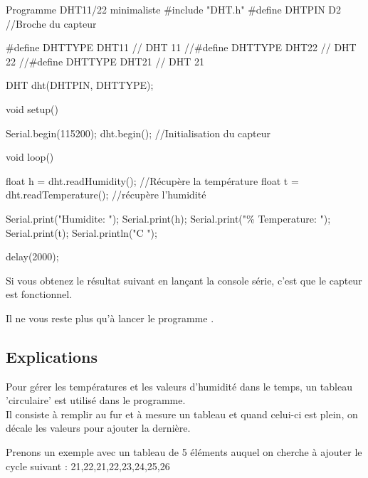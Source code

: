 \begin{Cpp}{Programme DHT11/22 minimaliste}
    #include "DHT.h"
    #define DHTPIN D2     //Broche du capteur
    
    #define DHTTYPE DHT11   // DHT 11
    //#define DHTTYPE DHT22   // DHT 22 
    //#define DHTTYPE DHT21   // DHT 21 
    
    DHT dht(DHTPIN, DHTTYPE);
    
    void setup() {
      
      Serial.begin(115200);
      dht.begin();          //Initialisation du capteur
    }
    
    void loop() {
    
      float h = dht.readHumidity();       //Récupère la température
      float t = dht.readTemperature();    //récupère l'humidité
    
      Serial.print("Humidite: ");
      Serial.print(h);
      Serial.print("\%  Temperature: ");
      Serial.print(t);
      Serial.println("C ");
      
      delay(2000);
    
    }
\end{Cpp}

Si vous obtenez le résultat suivant en lançant la console série, c'est que le capteur est fonctionnel.


Il ne vous reste plus qu'à lancer le programme .

\subsection{Explications}

Pour gérer les températures et les valeurs d'humidité dans le temps, un tableau 'circulaire' est utilisé dans le programme. \\
Il consiste à remplir au fur et à mesure un tableau et quand celui-ci est plein, on décale les valeurs pour ajouter la dernière.

Prenons un exemple avec un tableau de 5 éléments auquel on cherche à ajouter le cycle suivant : 21,22,21,22,23,24,25,26 \\

